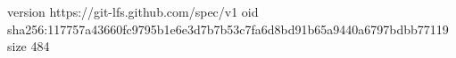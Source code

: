 version https://git-lfs.github.com/spec/v1
oid sha256:117757a43660fc9795b1e6e3d7b7b53c7fa6d8bd91b65a9440a6797bdbb77119
size 484
